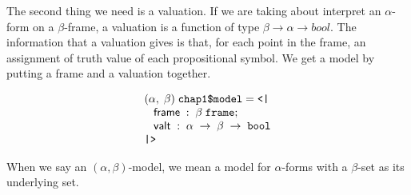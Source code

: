 \documentclass[letterpaper]{article}
\newenvironment{holmath}{\begin{displaymath}\begin{array}{l}}{\end{array}\end{displaymath}\ignorespacesafterend}
\begin{document}
The second thing we need is a valuation. If we are taking about interpret an $\alpha$-form on a $\beta$-frame, a valuation is a function of type $\beta\to\alpha\to bool$. The information that a valuation gives is that, for each point in the frame, an assignment of truth value of each propositional symbol. We get a model by putting a frame and a valuation together.

\begin{holmath}
  (\ensuremath{\alpha},\;\ensuremath{\beta})\;\HOLTyOp{chap1\$model} = \HOLTokenLeftrec{}\\
\;\;\;\HOLFieldName{frame}\;:\;\ensuremath{\beta}\;\HOLTyOp{frame};\\
\;\;\;\HOLFieldName{valt}\;:\;\ensuremath{\alpha}\;\ensuremath{\rightarrow}\;\ensuremath{\beta}\;\ensuremath{\rightarrow}\;\HOLTyOp{bool}\\
\HOLTokenRightrec{}
\end{holmath}

When we say an $(\alpha,\beta)$-model, we mean a model for $\alpha$-forms with a $\beta$-set as its underlying set.
\end{document}
